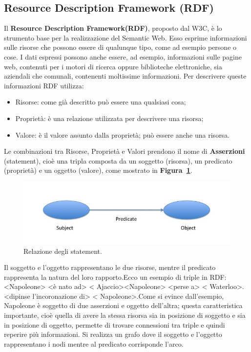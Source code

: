 \documentclass[a4paper,11pt]{article}
\begin{document}
\subsection{Resource Description Framework (RDF)}
\label{sec:2.2}
Il \textbf{Resource Description Framework(RDF)}, proposto dal W3C, è lo strumento base per la realizzazione del Semantic Web. Esso esprime informazioni sulle risorse che possono essere di qualunque tipo, come ad esempio persone o cose.\newline
I dati espressi possono anche essere, ad esempio, informazioni sulle pagine web, contenuti per i motori di ricerca oppure biblioteche elettroniche, sia aziendali che comunali, contenenti moltissime informazioni.
Per descrivere queste informazioni RDF utilizza:
\begin{itemize}
	\item Risorse: come già descritto può essere una qualsiasi cosa;
	\item Proprietà: è una relazione utilizzata per descrivere una risorsa;
	\item Valore: è il valore assunto dalla proprietà; può essere anche una risorsa.
\end{itemize}
Le combinazioni tra Risorse, Proprietà e Valori prendono il nome di \textbf{Asserzioni} (statement), cioè una tripla composta da un soggetto (risorsa), un predicato (proprietà) e un oggetto (valore), come mostrato in \textbf{Figura~\ref{fig:3}}.

\begin{figure}[htbp]
	\centering
	\includegraphics[scale=0.5]{Assertion.jpg}
	\caption{Relazione degli statement.}
	\label{fig:3}
\end{figure}\newpage 

Il soggetto e l'oggetto rappresentano le due risorse, mentre il predicato rappresenta la natura del loro rapporto.\newline Ecco un esempio di triple in RDF:\newline <Napoleone> <è nato ad> < Ajaccio>\newline <Napoleone> <perse a> < Waterloo>. <dipinse l'incoronazione di> < Napoleone>.\newline Come si evince dall'esempio, Napoleone è soggetto di due asserzioni e oggetto dell'altra; questa caratteristica importante, cioè quella di avere la stessa risorsa sia in posizione di soggetto e sia in posizione di oggetto, permette di trovare connessioni tra triple e quindi reperire più informazioni.
Si realizza un grafo dove il soggetto e l'oggetto rappresentano i nodi mentre al predicato corrisponde l'arco.
\end{document}

